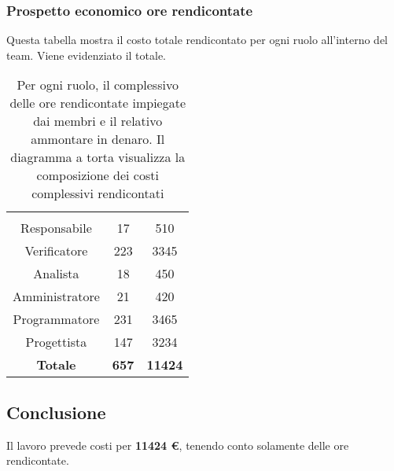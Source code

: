 \subsubsection{Prospetto economico ore rendicontate}
Questa tabella mostra il costo totale rendicontato per ogni ruolo all'interno del team. Viene evidenziato il totale.

\begin{table}[H]
	{\setlength{\parindent}{0cm}
		\begin{minipage}{.43\textwidth}
			\begin{tabular}{ccc}
				\rowcolorhead
				\headertitle{Ruolo} & \headertitle{Ore} & \headertitle{Costo(€)}\\
				Responsabile & 17 & 510\\
				Verificatore & 223 & 3345\\
				Analista & 18 & 450\\
				Amministratore & 21 & 420\\
				Programmatore & 231 & 3465\\
				Progettista & 147 & 3234\\
				\hline
				\textbf{Totale} & \textbf{657} & \textbf{11424}\\
			\end{tabular}
		\end{minipage}%
		\begin{minipage}{.57\textwidth}
	\end{minipage} }
	\caption[Prospetto economico complessivo delle ore rendicontate]{Per ogni ruolo, il complessivo delle ore rendicontate impiegate dai membri e il relativo ammontare in denaro. Il diagramma a torta visualizza la composizione dei costi complessivi rendicontati}
\end{table}


\subsection{Conclusione}
Il lavoro prevede costi per \textbf{11424 €}, tenendo conto solamente delle ore rendicontate.
